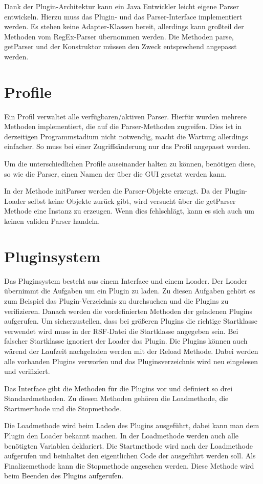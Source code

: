 \documentclass[a4paper,11pt,abstracton,titlepage]{scrartcl}
\begin{document}
Dank der Plugin-Architektur kann ein Java Entwickler leicht eigene Parser
entwickeln. Hierzu muss das Plugin- und das Parser-Interface implementiert
werden. Es stehen keine Adapter-Klassen bereit, allerdings kann großteil der
Methoden vom RegEx-Parser übernommen werden. Die Methoden parse, getParser und
der Konstruktor müssen den Zweck entsprechend angepasst werden.  

\section{Profile}
Ein Profil verwaltet alle verfügbaren/aktiven Parser. Hierfür wurden mehrere
Methoden implementiert, die auf die Parser-Methoden zugreifen. Dies ist in
derzeitigen Programmstadium nicht notwendig, macht die Wartung allerdings
einfacher. So muss bei einer Zugriffsänderung nur das Profil angepasst werden.

Um die unterschiedlichen Profile auseinander halten zu können, benötigen diese,
so wie die Parser, einen Namen der über die GUI gesetzt werden kann.

In der Methode initParser werden die Parser-Objekte erzeugt. Da der
Plugin-Loader selbst keine Objekte zurück gibt, wird versucht über die getParser
Methode eine Instanz zu erzeugen. Wenn dies fehlschlägt, kann es sich auch um
keinen validen Parser handeln.

\section{Pluginsystem}
Das Pluginsystem besteht aus einem Interface und einem Loader.
Der Loader übernimmt die Aufgaben um ein Plugin zu laden.
Zu diesen Aufgaben gehört es zum Beispiel das Plugin-Verzeichnis zu durchsuchen
und die Plugins zu verifizieren. Danach werden die vordefinierten Methoden der
geladenen Plugins aufgerufen. Um sicherzustellen, dass bei größeren Plugins die
richtige Startklasse verwendet wird muss in der RSF-Datei die Startklasse
angegeben sein.
Bei falscher Startklasse ignoriert der Loader das Plugin.
Die Plugins können auch wärend der Laufzeit nachgeladen werden mit der Reload
Methode. Dabei werden alle vorhanden Plugins verworfen und das
Pluginsverzeichnis wird neu eingelesen und verifiziert.

Das Interface gibt die Methoden für die Plugins vor und definiert so drei
Standardmethoden.  Zu diesen Methoden gehören die Loadmethode, die Startmerthode
und die Stopmethode. 

Die Loadmethode wird beim Laden des Plugins ausgeführt, dabei kann man dem
Plugin den Loader bekannt machen. In der Loadmethode werden auch alle benötigten
Variablen deklariert. Die Startmethode wird nach der Loadmethode aufgerufen und
beinhaltet den eigentlichen Code der ausgeführt werden soll.
Als Finalizemethode kann die Stopmethode angesehen werden. Diese Methode wird
beim Beenden des Plugins aufgerufen.
\end{document}
